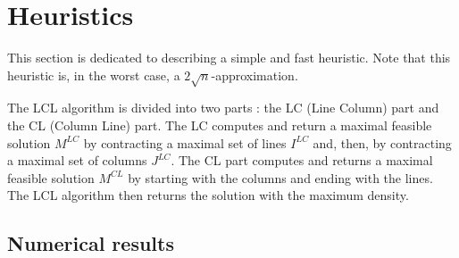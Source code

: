 
\section{Heuristics}

\begin{comment}
\begin{itemize}
\item Avant toute chose tester Greedy VS LCL VS Neighborization sur des grosses instances (jusqu'à combien va le LCL?).
\item Présenter ceux qui marchent et ceux qui marchent pas
\item Contreexemple? Explication rapide du pire cas?
\end{itemize}
\end{comment}

This section is dedicated to describing a simple and fast heuristic. Note that this heuristic is, in the worst case, a $2\sqrt{n}$-approximation.

The LCL algorithm is divided into two parts : the LC (Line Column) part and the CL (Column Line) part. The LC computes and return a maximal feasible solution $M^{LC}$ by contracting a maximal set of lines $I^{LC}$ and, then, by contracting a maximal set of columns $J^{LC}$. The CL part computes and returns a maximal feasible solution $M^{CL}$ by starting with the columns and ending with the lines. The LCL algorithm then returns the solution with the maximum density.


\subsection{Numerical results}

